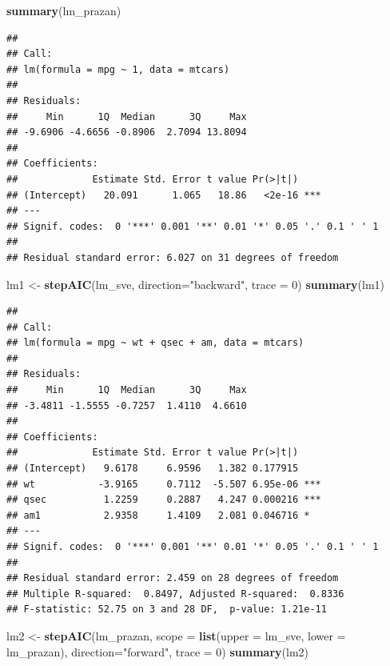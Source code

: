 \documentclass[]{book}
\newenvironment{Shaded}{\begin{snugshade}}{\end{snugshade}}
\newcommand{\KeywordTok}[1]{\textcolor[rgb]{0.13,0.29,0.53}{\textbf{#1}}}
\newcommand{\DataTypeTok}[1]{\textcolor[rgb]{0.13,0.29,0.53}{#1}}
\newcommand{\DecValTok}[1]{\textcolor[rgb]{0.00,0.00,0.81}{#1}}
\newcommand{\StringTok}[1]{\textcolor[rgb]{0.31,0.60,0.02}{#1}}
\newcommand{\NormalTok}[1]{#1}
\theoremstyle{definition}
\theoremstyle{definition}
\theoremstyle{definition}
\theoremstyle{remark}
\begin{document}
\begin{Shaded}
\begin{Highlighting}[]
\KeywordTok{summary}\NormalTok{(lm_prazan)}
\end{Highlighting}
\end{Shaded}

\begin{verbatim}
## 
## Call:
## lm(formula = mpg ~ 1, data = mtcars)
## 
## Residuals:
##     Min      1Q  Median      3Q     Max 
## -9.6906 -4.6656 -0.8906  2.7094 13.8094 
## 
## Coefficients:
##             Estimate Std. Error t value Pr(>|t|)    
## (Intercept)   20.091      1.065   18.86   <2e-16 ***
## ---
## Signif. codes:  0 '***' 0.001 '**' 0.01 '*' 0.05 '.' 0.1 ' ' 1
## 
## Residual standard error: 6.027 on 31 degrees of freedom
\end{verbatim}

\begin{Shaded}
\begin{Highlighting}[]
\NormalTok{lm1 <-}\StringTok{ }\KeywordTok{stepAIC}\NormalTok{(lm_sve, }\DataTypeTok{direction=}\StringTok{"backward"}\NormalTok{, }\DataTypeTok{trace =} \DecValTok{0}\NormalTok{) }
\KeywordTok{summary}\NormalTok{(lm1)}
\end{Highlighting}
\end{Shaded}

\begin{verbatim}
## 
## Call:
## lm(formula = mpg ~ wt + qsec + am, data = mtcars)
## 
## Residuals:
##     Min      1Q  Median      3Q     Max 
## -3.4811 -1.5555 -0.7257  1.4110  4.6610 
## 
## Coefficients:
##             Estimate Std. Error t value Pr(>|t|)    
## (Intercept)   9.6178     6.9596   1.382 0.177915    
## wt           -3.9165     0.7112  -5.507 6.95e-06 ***
## qsec          1.2259     0.2887   4.247 0.000216 ***
## am1           2.9358     1.4109   2.081 0.046716 *  
## ---
## Signif. codes:  0 '***' 0.001 '**' 0.01 '*' 0.05 '.' 0.1 ' ' 1
## 
## Residual standard error: 2.459 on 28 degrees of freedom
## Multiple R-squared:  0.8497, Adjusted R-squared:  0.8336 
## F-statistic: 52.75 on 3 and 28 DF,  p-value: 1.21e-11
\end{verbatim}

\begin{Shaded}
\begin{Highlighting}[]
\NormalTok{lm2 <-}\StringTok{ }\KeywordTok{stepAIC}\NormalTok{(lm_prazan, }\DataTypeTok{scope =} \KeywordTok{list}\NormalTok{(}\DataTypeTok{upper =}\NormalTok{ lm_sve, }\DataTypeTok{lower =}\NormalTok{ lm_prazan), }
                \DataTypeTok{direction=}\StringTok{"forward"}\NormalTok{, }\DataTypeTok{trace =} \DecValTok{0}\NormalTok{)}
\KeywordTok{summary}\NormalTok{(lm2)}
\end{Highlighting}
\end{Shaded}
\end{document}
